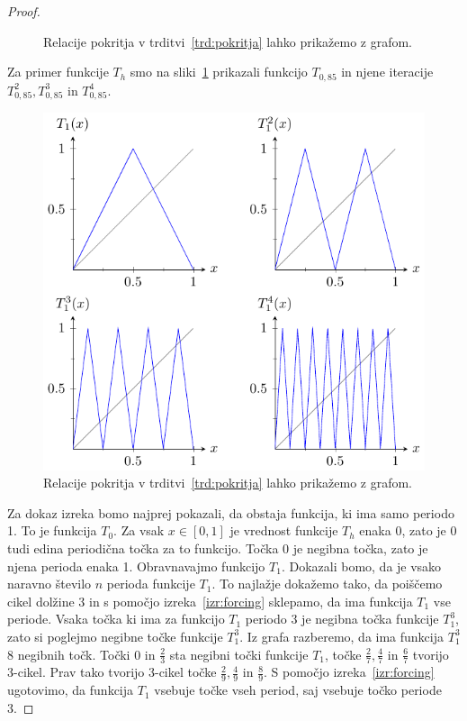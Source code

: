 \documentclass[mat2]{fmfdelo}
\begin{document}
\begin{proof}
\begin{figure}[h]
  \caption[Primer vektorske slike.]{Relacije pokritja v trditvi~\ref{trd:pokritja} lahko prikažemo z grafom.}
  \label{fig:Th}
\end{figure}

Za primer funkcije $T_h$ smo na sliki~\ref{fig:Th} prikazali funkcijo $T_{0,85}$ in njene iteracije $T_{0,85}^2, T_{0,85}^3$ in $T_{0,85}^4$.

\begin{figure}[h]
  \centering
  \includegraphics{images/funkcija_T1.pdf}
  \caption[Primer vektorske slike.]{Relacije pokritja v trditvi~\ref{trd:pokritja} lahko prikažemo z grafom.}
  \label{fig:T1}
\end{figure}


Za dokaz izreka bomo najprej pokazali, da obstaja funkcija, ki ima samo periodo 1. To je funkcija $T_0$. Za vsak $x \in [0, 1]$ je vrednost funkcije $T_h$ enaka 0, zato je 0 tudi edina periodična točka za to funkcijo. Točka 0 je negibna točka, zato je njena perioda enaka 1.
Obravnavajmo funkcijo $T_1$. Dokazali bomo, da je vsako naravno število $n$ perioda funkcije $T_1$. To najlažje dokažemo tako, da poiščemo cikel dolžine 3 in s pomočjo izreka~\ref{izr:forcing} sklepamo, da ima funkcija $T_1$ vse periode. Vsaka točka ki ima za funkcijo $T_1$ periodo 3 je negibna točka funkcije $T_1^3$, zato si poglejmo negibne točke funkcije $T_1^3$. Iz grafa razberemo, da ima funkcija $T_1^3$ 8 negibnih točk. Točki 0 in $\frac{2}{3}$ sta negibni točki funkcije $T_1$, točke $\frac{2}{7}, \frac{4}{7}$ in $\frac{6}{7}$ tvorijo 3-cikel. Prav tako tvorijo 3-cikel točke  $\frac{2}{9}, \frac{4}{9}$ in $\frac{8}{9}$. S pomočjo izreka~\ref{izr:forcing} ugotovimo, da funkcija $T_1$ vsebuje točke vseh period, saj vsebuje točko periode 3.


\end{proof}
\end{document}
